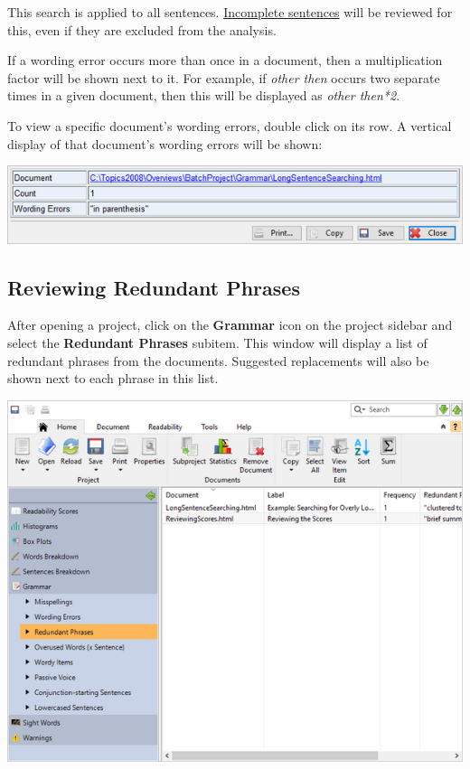 \documentclass[
]{book}
\theoremstyle{definition}
\theoremstyle{definition}
\theoremstyle{definition}
\theoremstyle{definition}
\theoremstyle{remark}
\begin{document}
This search is applied to all sentences. \protect\hyperlink{how-text-is-excluded}{Incomplete sentences} will be reviewed for this, even if they are excluded from the analysis.

If a wording error occurs more than once in a document, then a multiplication factor will be shown next to it. For example, if \emph{other then} occurs two separate times in a given document, then this will be displayed as \emph{other then*2}.

To view a specific document's wording errors, double click on its row. A vertical display of that document's wording errors will be shown:

\includegraphics{Images/batchwordingerrorsviewitem.png}

\hypertarget{reviewing-batch-redundant-phrases}{%
\subsection*{Reviewing Redundant Phrases}\label{reviewing-batch-redundant-phrases}}

After opening a project, click on the \textbf{Grammar} icon on the project sidebar and select the \textbf{Redundant Phrases} subitem. This window will display a list of redundant phrases from the documents. Suggested replacements will also be shown next to each phrase in this list.

\includegraphics{Images/batchredundantphrases.png}
\end{document}
